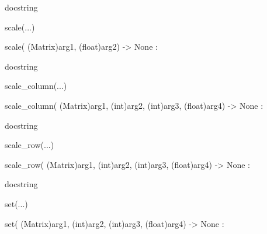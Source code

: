 \documentclass[letterpaper,10pt,english]{sphinxmanual}
\begin{document}
\begin{description}
\begin{description}
\begin{DUlineblock}{0em}
\begin{DUlineblock}{\DUlineblockindent}
\begin{DUlineblock}{\DUlineblockindent}
\item[] docstring
\item[] 
\end{DUlineblock}
\end{DUlineblock}
\item[] scale(...)
\item[]
\begin{DUlineblock}{\DUlineblockindent}
\item[] scale( (Matrix)arg1, (float)arg2) -\textgreater{} None :
\item[]
\begin{DUlineblock}{\DUlineblockindent}
\item[] docstring
\item[] 
\end{DUlineblock}
\end{DUlineblock}
\item[] scale\_column(...)
\item[]
\begin{DUlineblock}{\DUlineblockindent}
\item[] scale\_column( (Matrix)arg1, (int)arg2, (int)arg3, (float)arg4) -\textgreater{} None :
\item[]
\begin{DUlineblock}{\DUlineblockindent}
\item[] docstring
\item[] 
\end{DUlineblock}
\end{DUlineblock}
\item[] scale\_row(...)
\item[]
\begin{DUlineblock}{\DUlineblockindent}
\item[] scale\_row( (Matrix)arg1, (int)arg2, (int)arg3, (float)arg4) -\textgreater{} None :
\item[]
\begin{DUlineblock}{\DUlineblockindent}
\item[] docstring
\item[] 
\end{DUlineblock}
\end{DUlineblock}
\item[] set(...)
\item[]
\begin{DUlineblock}{\DUlineblockindent}
\item[] set( (Matrix)arg1, (int)arg2, (int)arg3, (float)arg4) -\textgreater{} None :
\item[]
\begin{DUlineblock}{\DUlineblockindent}

\end{DUlineblock}
\end{DUlineblock}
\end{DUlineblock}
\end{description}
\end{description}
\end{document}

